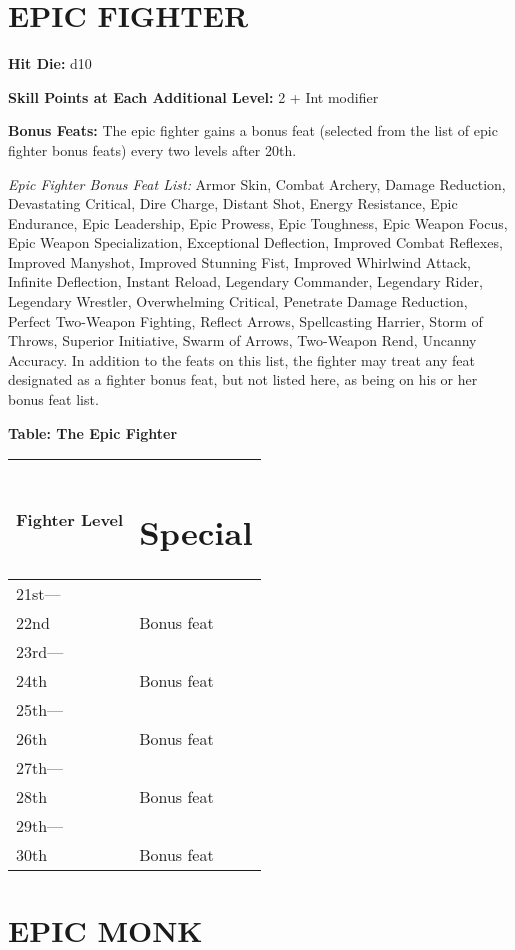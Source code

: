 \documentclass{article}
\begin{document}
\vspace{12pt}
\section*{{\LARGE{}EPIC FIGHTER }}

\textbf{Hit Die:} d10

\textbf{Skill Points at Each Additional Level:} 2 + Int modifier

\textbf{Bonus Feats:} The epic fighter gains a bonus feat (selected from the list 
of epic fighter bonus feats) every two levels after 20th. 

\textit{Epic Fighter Bonus Feat List: }Armor Skin, Combat Archery, Damage Reduction, 
Devastating Critical, Dire Charge, Distant Shot, Energy Resistance, Epic Endurance, 
Epic Leadership, Epic Prowess, Epic Toughness, Epic Weapon Focus, Epic Weapon Specialization, 
Exceptional Deflection, Improved Combat Reflexes, Improved Manyshot, Improved Stunning 
Fist, Improved Whirlwind Attack, Infinite Deflection, Instant Reload, Legendary 
Commander, Legendary Rider, Legendary Wrestler, Overwhelming Critical, Penetrate 
Damage Reduction, Perfect Two-Weapon Fighting, Reflect Arrows, Spellcasting Harrier, 
Storm of Throws, Superior Initiative, Swarm of Arrows, Two-Weapon Rend, Uncanny 
Accuracy. In addition to the feats on this list, the fighter may treat any feat 
designated as a fighter bonus feat, but not listed here, as being on his or her 
bonus feat list. 

\textbf{Table: The Epic Fighter }

\begin{tabular}{|>{\raggedright}p{38pt}|>{\raggedright}p{60pt}|}
\hline
F\textbf{ighter Level} & \section*{S\textbf{pecial }}\tabularnewline
\hline
21st--- &  \tabularnewline
\hline
22nd & Bonus feat \tabularnewline
\hline
23rd--- &  \tabularnewline
\hline
24th & Bonus feat \tabularnewline
\hline
25th--- &  \tabularnewline
\hline
26th & Bonus feat \tabularnewline
\hline
27th--- &  \tabularnewline
\hline
28th & Bonus feat \tabularnewline
\hline
29th--- &  \tabularnewline
\hline
30th & Bonus feat \tabularnewline
\hline
\end{tabular}

\vspace{24pt}
\section*{{\LARGE{}EPIC MONK }}
\end{document}
